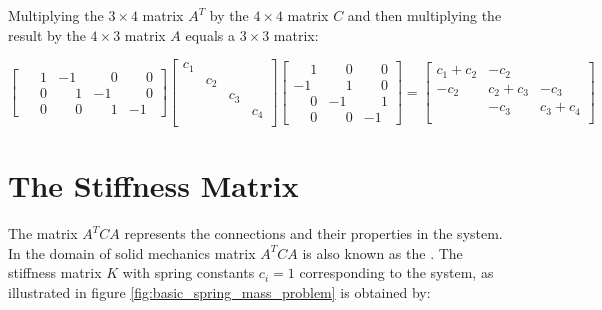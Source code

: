 Multiplying the $3 \times 4$ matrix $A^T$ by the $4 \times 4$ matrix
$C$ and then multiplying the result by the $4 \times 3$ matrix $A$ equals
a $3 \times 3$ matrix:

\begin{equation*}
\begin{bmatrix}
  \phantom{-}1 &           -1 & \phantom{-}0 & \phantom{-}0 \\
  \phantom{-}0 & \phantom{-}1 &           -1 & \phantom{-}0 \\
  \phantom{-}0 & \phantom{-}0 & \phantom{-}1 &           -1 
\end{bmatrix}
\begin{bmatrix}
c_1 &  &  &  \\
 & c_2 &  &  \\
 &  & c_3 &  \\
 &  &  & c_4 \\
\end{bmatrix}
\begin{bmatrix}
 \phantom{-}1 & \phantom{-}0 & \phantom{-}0 \\
           -1 & \phantom{-}1 & \phantom{-}0 \\
 \phantom{-}0 &           -1 & \phantom{-}1 \\
 \phantom{-}0 & \phantom{-}0 &           -1
\end{bmatrix}
=
\begin{bmatrix}
 c_1 + c_2 & -c_2       &            \\
      -c_2 &  c_2 + c_3 &       -c_3 \\
           &       -c_3 &  c_3 + c_4 \\
\end{bmatrix}
\end{equation*}

\section{The Stiffness Matrix}
\label{sec:the-stiffness-matrix}
The matrix $A^T C A$ represents the connections and their properties
in the system. In the domain of solid
mechanics matrix $A^T C A$ is also known as the 
. The stiffness matrix $K$ with spring constants
$c_i = 1$ corresponding to the
system, as illustrated in
figure \vref{fig:basic_spring_mass_problem} is obtained by:

